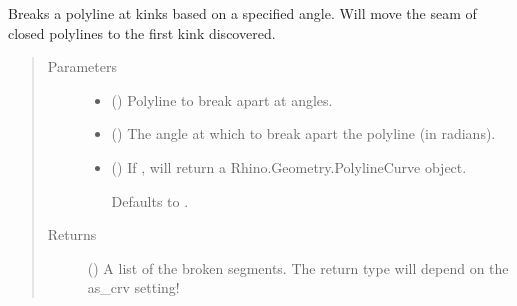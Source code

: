 \documentclass[letterpaper,10pt,english]{sphinxmanual}
\begin{document}

\begin{fulllineitems}
\label{\detokenize{cockatoo:cockatoo.utilities.break_polyline}}
Breaks a polyline at kinks based on a specified angle. Will move the seam
of closed polylines to the first kink discovered.
\begin{quote}\begin{description}
\item[{Parameters}] \leavevmode\begin{itemize}
\item {} 
 () \textendash{} Polyline to break apart at angles.

\item {} 
 () \textendash{} The angle at which to break apart the polyline (in radians).

\item {} 
 (\sphinxstyleliteralemphasis{\sphinxupquote{, }}) \textendash{} 
If , will return a Rhino.Geometry.PolylineCurve object.

Defaults to .


\end{itemize}

\item[{Returns}] \leavevmode
{} () \textendash{} A list of the broken segments. The return type will depend on the
as\_crv setting!

\end{description}\end{quote}

\end{fulllineitems}
\end{document}
